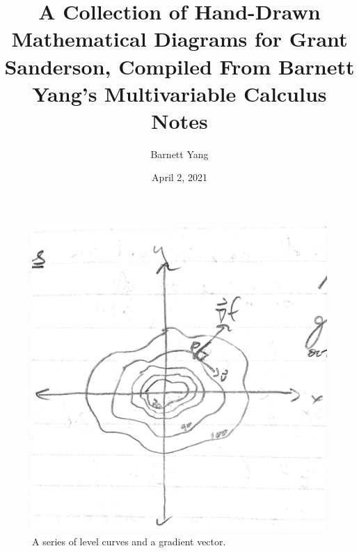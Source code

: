 \documentclass{article}[11pt]
\title{A Collection of Hand-Drawn Mathematical Diagrams for Grant Sanderson, Compiled From Barnett Yang's Multivariable Calculus Notes}
\author{Barnett Yang}
\date{April 2, 2021}
\begin{document}
\maketitle


\begin{figure}[h]
    \includegraphics[width=\textwidth]{img2.PNG}
    \caption{A series of level curves and a gradient vector.}
\end{figure}
\end{document}
